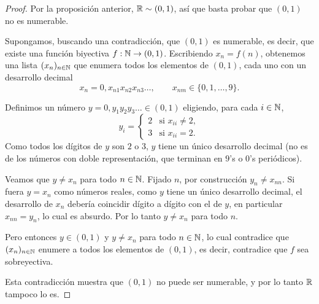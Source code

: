\begin{proof}
Por la proposición anterior, $\mathbb{R} \sim (0,1)$, así que basta probar que
$(0,1)$ no es numerable.

Supongamos, buscando una contradicción, que $(0,1)$ es numerable, es decir,
que existe una función biyectiva $f : \mathbb{N} \to (0,1)$. Escribiendo
$x_n = f(n)$, obtenemos una lista $(x_n)_{n\in\mathbb{N}}$ que enumera todos los
elementos de $(0,1)$, cada uno con un desarrollo decimal
\[
x_n = 0,x_{n1}x_{n2}x_{n3}\dots, \qquad x_{nm} \in \{0,1,\dots,9\}.
\]

Definimos un número $y = 0,y_1y_2y_3\dots \in (0,1)$ eligiendo, para cada
$i \in \mathbb{N}$,
\[
y_i =
\begin{cases}
2 & \text{si } x_{ii} \neq 2, \\
3 & \text{si } x_{ii} = 2.
\end{cases}
\]
Como todos los dígitos de $y$ son $2$ o $3$, $y$ tiene un único desarrollo
decimal (no es de los números con doble representación, que terminan en
$9$'s o $0$'s periódicos).

Veamos que $y \neq x_n$ para todo $n \in \mathbb{N}$. Fijado $n$, por construcción
$y_n \neq x_{nn}$. Si fuera $y = x_n$ como números reales, como $y$ tiene un
único desarrollo decimal, el desarrollo de $x_n$ debería coincidir dígito a
dígito con el de $y$, en particular $x_{nn} = y_n$, lo cual es absurdo. Por
lo tanto $y \neq x_n$ para todo $n$.

Pero entonces $y \in (0,1)$ y $y \neq x_n$ para todo $n \in \mathbb{N}$, lo cual
contradice que $(x_n)_{n\in\mathbb{N}}$ enumere a todos los elementos de $(0,1)$, es
decir, contradice que $f$ sea sobreyectiva.

Esta contradicción muestra que $(0,1)$ no puede ser numerable, y por lo
tanto $\mathbb{R}$ tampoco lo es.
\end{proof}
